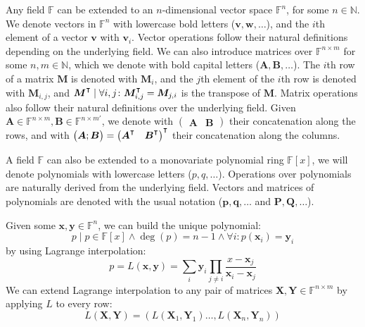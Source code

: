 Any field \(\mathbb{F}\) can be extended to an \(n\)-dimensional vector space
\(\mathbb{F}^n\), for some \(n \in \mathbb{N}\).
We denote vectors in \(\mathbb{F}^n\) with lowercase bold letters (\(\bm{v}, \bm{w}, \dots \)),
and the \(i\)th element of a vector \(\bm{v}\) with \(\bm{v}_i\).
Vector operations follow their natural definitions depending on the underlying field.
We can also introduce matrices over \(\mathbb{F}^{n \times m}\) for some \(n, m \in \mathbb{N}\),
which we denote with bold capital letters (\(\bm{A}, \bm{B}, \dots \)).
The \(i\)th row of a matrix \(\bm{M}\) is denoted with \(\bm{M}_i\), and the \(j\)th element of
the \(i\)th row is denoted with \(\bm{M}_{i,j}\), and 
\({\bm{M}}^\transpose \mid \forall i,j\colon {\bm{M}}^{\transpose}_{i,j} = \bm{M}_{j,i} \) is 
the transpose of \(\bm{M}\).
Matrix operations also follow their natural definitions over the underlying field.
Given \(\bm{A} \in \mathbb{F}^{n \times m}, \bm{B} \in \mathbb{F}^{n \times m'}\),
we denote with \(\begin{pmatrix}\bm{A} & \bm{B}\end{pmatrix}\) their concatenation along the rows,
and with \(\begin{pmatrix}\bm{A}; \bm{B}\end{pmatrix} =
{\begin{pmatrix}{\bm{A}}^{\transpose} & {\bm{B}}^{\transpose}\end{pmatrix}}^{\transpose}\)
their concatenation along the columns.

A field \(\mathbb{F}\) can also be extended to a monovariate polynomial ring \(\mathbb{F}[x]\),
we will denote polynomials with lowercase letters (\(p, q, \dots \)).
Operations over polynomials are naturally derived from the underlying field.
Vectors and matrices of polynomials are denoted with the usual notation
(\(\bm{p}, \bm{q}, \dots \) and \(\bm{P}, \bm{Q}, \dots \)).

Given some \(\bm{x}, \bm{y} \in \mathbb{F}^n\), we can build the unique polynomial:
\[
	p \mid {p \in \mathbb{F}\left[x\right]} \land {\deg\left(p\right) = n-1} \land
	{\forall i\colon p\left(\bm{x}_i\right) = \bm{y}_i}
\]
by using Lagrange interpolation:
\[
	p = L\left(\bm{x}, \bm{y}\right) =
	\sum_{i}{\bm{y}_{i}\prod_{j \neq i}{\frac{x - \bm{x}_j}{\bm{x}_i - \bm{x}_j}}}
\]
We can extend Lagrange interpolation to any pair of matrices
\(\bm{X}, \bm{Y} \in \mathbb{F}^{n\times m}\) by applying \(L\) to every row:
\[
	L\left(\bm{X}, \bm{Y}\right) =
	\left(L\left(\bm{X}_1, \bm{Y}_1\right) \dots, L\left(\bm{X}_n, \bm{Y}_n\right)\right)
\]

